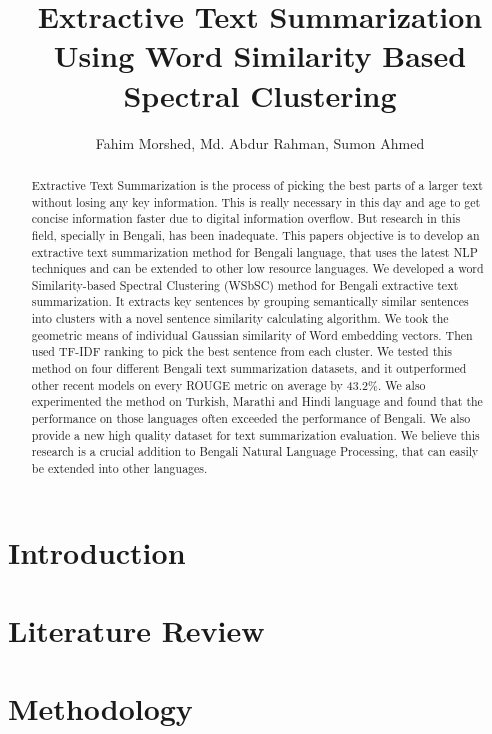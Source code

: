 \documentclass[11pt]{article}
\title{Extractive Text Summarization Using Word Similarity Based Spectral Clustering}
\author{Fahim Morshed, Md. Abdur Rahman, Sumon Ahmed}
\begin{document}
    \maketitle
    \setlength{\parindent}{0pt}
    \begin{abstract}
        Extractive Text Summarization is the process of picking the best parts of
        a larger text without losing any key information.
        This is really necessary in this day and age to get concise information
        faster due to digital information overflow.
        But research in this field, specially in Bengali, has been inadequate.
        This papers objective is to develop an extractive text summarization
        method for Bengali language, that uses the latest NLP techniques
        and can be extended to other low resource languages.
        We developed a word Similarity-based Spectral Clustering (WSbSC) method
        for Bengali extractive text summarization.
        It extracts key sentences by grouping semantically similar sentences into clusters
        with a novel sentence similarity calculating algorithm.
        We took the geometric means of individual Gaussian similarity of Word embedding vectors.
        Then used TF-IDF ranking to pick the best sentence from each cluster.
        We tested this method on four different Bengali text summarization datasets,
        and it outperformed other recent models on every ROUGE metric on average by 43.2\%.
        We also experimented the method on Turkish, Marathi and Hindi language and found that the
        performance on those languages often exceeded the performance of Bengali.
        We also provide a new high quality dataset for text summarization evaluation.
        We believe this research is a crucial addition to Bengali Natural Language Processing,
        that can easily be extended into other languages.
    \end{abstract}

    \section{Introduction}\label{sec:introduction}
    

    \section{Literature Review}\label{sec:literature-review}
    

    \section{Methodology}\label{sec:methodology}
    
\end{document}
